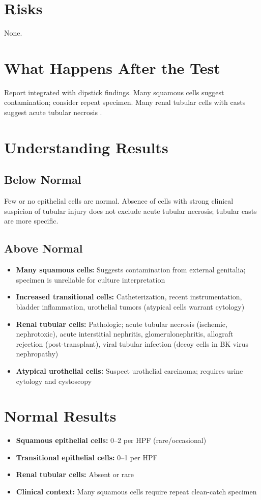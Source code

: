 \section*{Risks}
None.

\section*{What Happens After the Test}
Report integrated with dipstick findings. Many squamous cells suggest contamination; consider repeat specimen. Many renal tubular cells with casts suggest acute tubular necrosis \cite{perazella2015urine}.

\section*{Understanding Results}

\subsection*{Below Normal}
Few or no epithelial cells are normal. Absence of cells with strong clinical suspicion of tubular injury does not exclude acute tubular necrosis; tubular casts are more specific.

\subsection*{Above Normal}
\begin{itemize}
  \item \textbf{Many squamous cells:} Suggests contamination from external genitalia; specimen is unreliable for culture interpretation
  \item \textbf{Increased transitional cells:} Catheterization, recent instrumentation, bladder inflammation, urothelial tumors (atypical cells warrant cytology)
  \item \textbf{Renal tubular cells:} Pathologic; acute tubular necrosis (ischemic, nephrotoxic), acute interstitial nephritis, glomerulonephritis, allograft rejection (post-transplant), viral tubular infection (decoy cells in BK virus nephropathy)
  \item \textbf{Atypical urothelial cells:} Suspect urothelial carcinoma; requires urine cytology and cystoscopy
\end{itemize}

\section*{Normal Results}
\begin{itemize}
  \item \textbf{Squamous epithelial cells:} 0--2 per HPF (rare/occasional)
  \item \textbf{Transitional epithelial cells:} 0--1 per HPF
  \item \textbf{Renal tubular cells:} Absent or rare
  \item \textbf{Clinical context:} Many squamous cells require repeat clean-catch specimen
\end{itemize}

